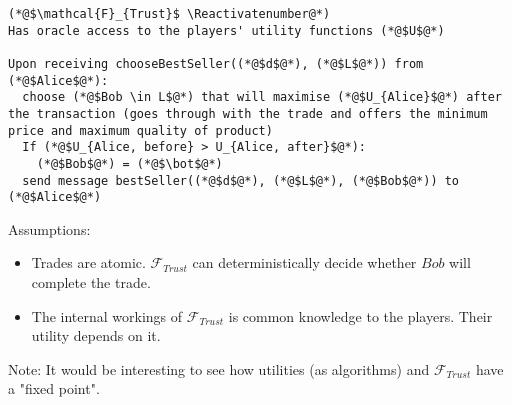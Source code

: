 \Suppressnumber
\begin{lstlisting}[label=trustfunc, style=numbers]
(*@$\mathcal{F}_{Trust}$ \Reactivatenumber@*)
Has oracle access to the players' utility functions (*@$U$@*)

Upon receiving chooseBestSeller((*@$d$@*), (*@$L$@*)) from (*@$Alice$@*):
  choose (*@$Bob \in L$@*) that will maximise (*@$U_{Alice}$@*) after the transaction (goes through with the trade and offers the minimum price and maximum quality of product)
  If (*@$U_{Alice, before} > U_{Alice, after}$@*):
    (*@$Bob$@*) = (*@$\bot$@*)
  send message bestSeller((*@$d$@*), (*@$L$@*), (*@$Bob$@*)) to (*@$Alice$@*)
\end{lstlisting}

Assumptions:
\begin{itemize}
  \item Trades are atomic. $\mathcal{F}_{Trust}$ can deterministically decide whether
  $Bob$ will complete the trade.
  \item The internal workings of $\mathcal{F}_{Trust}$ is common knowledge to the players.
  Their utility depends on it.
\end{itemize}
Note: It would be interesting to see how utilities (as algorithms) and
$\mathcal{F}_{Trust}$ have a "fixed point".
